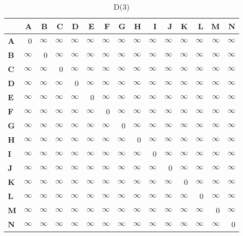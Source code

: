\documentclass{article}
\newcommand{\INF}{$\infty$}
\begin{document}
\begin{table}[H]\centering
\caption{D(3)}
\begin{tabular}{l r r r r r r r r r r r r r r}
\toprule
 & \textbf{A} & \textbf{B} & \textbf{C} & \textbf{D} & \textbf{E} & \textbf{F} & \textbf{G} & \textbf{H} & \textbf{I} & \textbf{J} & \textbf{K} & \textbf{L} & \textbf{M} & \textbf{N}\\\midrule
\textbf{A} & 0 & \INF & \INF & \INF & \INF & \INF & \INF & \INF & \INF & \INF & \INF & \INF & \INF & \INF \\
\textbf{B} & \INF & 0 & \INF & \INF & \INF & \INF & \INF & \INF & \INF & \INF & \INF & \INF & \INF & \INF \\
\textbf{C} & \INF & \INF & 0 & \INF & \INF & \INF & \INF & \INF & \INF & \INF & \INF & \INF & \INF & \INF \\
\textbf{D} & \INF & \INF & \INF & 0 & \INF & \INF & \INF & \INF & \INF & \INF & \INF & \INF & \INF & \INF \\
\textbf{E} & \INF & \INF & \INF & \INF & 0 & \INF & \INF & \INF & \INF & \INF & \INF & \INF & \INF & \INF \\
\textbf{F} & \INF & \INF & \INF & \INF & \INF & 0 & \INF & \INF & \INF & \INF & \INF & \INF & \INF & \INF \\
\textbf{G} & \INF & \INF & \INF & \INF & \INF & \INF & 0 & \INF & \INF & \INF & \INF & \INF & \INF & \INF \\
\textbf{H} & \INF & \INF & \INF & \INF & \INF & \INF & \INF & 0 & \INF & \INF & \INF & \INF & \INF & \INF \\
\textbf{I} & \INF & \INF & \INF & \INF & \INF & \INF & \INF & \INF & 0 & \INF & \INF & \INF & \INF & \INF \\
\textbf{J} & \INF & \INF & \INF & \INF & \INF & \INF & \INF & \INF & \INF & 0 & \INF & \INF & \INF & \INF \\
\textbf{K} & \INF & \INF & \INF & \INF & \INF & \INF & \INF & \INF & \INF & \INF & 0 & \INF & \INF & \INF \\
\textbf{L} & \INF & \INF & \INF & \INF & \INF & \INF & \INF & \INF & \INF & \INF & \INF & 0 & \INF & \INF \\
\textbf{M} & \INF & \INF & \INF & \INF & \INF & \INF & \INF & \INF & \INF & \INF & \INF & \INF & 0 & \INF \\
\textbf{N} & \INF & \INF & \INF & \INF & \INF & \INF & \INF & \INF & \INF & \INF & \INF & \INF & \INF & 0 \\
\bottomrule
\end{tabular}
\end{table}
\end{document}
